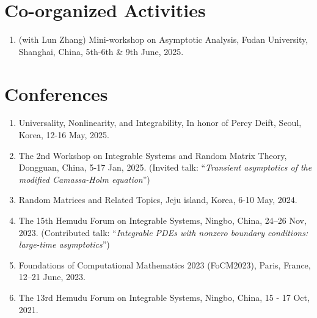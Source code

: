 \documentclass[margin]{res}
\begin{document}
\begin{resume}
\section{Co-organized Activities}
\begin{enumerate}[--]
    \item (with Lun Zhang) Mini-workshop on Asymptotic Analysis, Fudan University, Shanghai, China, 5th-6th \& 9th June, 2025.
\end{enumerate}


\section{Conferences}
\begin{enumerate}[--]
\item Universality, Nonlinearity, and Integrability, In honor of Percy Deift, Seoul, Korea, 12-16 May, 2025.
\item The 2nd Workshop on Integrable Systems and Random Matrix Theory, Dongguan, China, 5-17 Jan, 2025. (Invited talk: ``{\sl Transient asymptotics of the modified Camassa-Holm equation}'')
\item Random Matrices and Related Topics, Jeju island, Korea, 6-10 May, 2024.
\item The 15th Hemudu Forum on Integrable Systems, Ningbo, China, 24--26 Nov, 2023. (Contributed talk: ``{\sl Integrable PDEs with nonzero boundary conditions: large-time asymptotics}'')
\item Foundations of Computational Mathematics 2023 (FoCM2023), Paris, France, 12--21 June, 2023.
\item The 13rd Hemudu Forum on Integrable Systems, Ningbo, China, 15 - 17 Oct, 2021.
\end{enumerate}






\end{resume}
\end{document}
